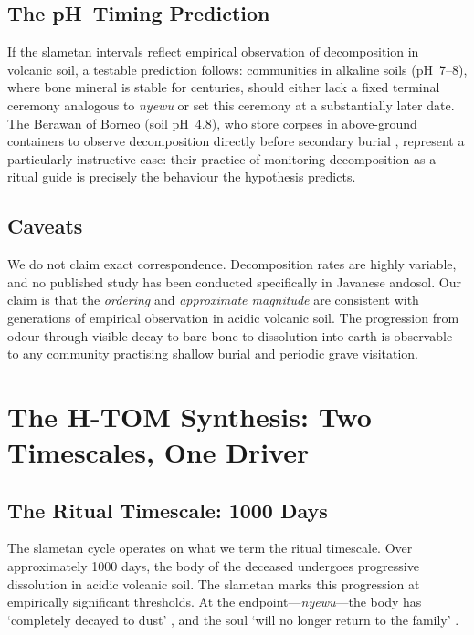 \documentclass[12pt,a4paper]{article}
\begin{document}
\subsection{The pH--Timing Prediction}

If the slametan intervals reflect empirical observation of decomposition in volcanic soil, a testable prediction follows: communities in alkaline soils (pH~7--8), where bone mineral is stable for centuries, should either lack a fixed terminal ceremony analogous to \textit{nyewu} or set this ceremony at a substantially later date. The Berawan of Borneo (soil pH~4.8), who store corpses in above-ground containers to observe decomposition directly before secondary burial \citep{metcalf_1982}, represent a particularly instructive case: their practice of monitoring decomposition as a ritual guide is precisely the behaviour the hypothesis predicts.

\subsection{Caveats}

We do not claim exact correspondence. Decomposition rates are highly variable, and no published study has been conducted specifically in Javanese andosol. Our claim is that the \textit{ordering} and \textit{approximate magnitude} are consistent with generations of empirical observation in acidic volcanic soil. The progression from odour through visible decay to bare bone to dissolution into earth is observable to any community practising shallow burial and periodic grave visitation.


\section{The H-TOM Synthesis: Two Timescales, One Driver}

\subsection{The Ritual Timescale: 1000 Days}

The slametan cycle operates on what we term the ritual timescale. Over approximately 1000 days, the body of the deceased undergoes progressive dissolution in acidic volcanic soil. The slametan marks this progression at empirically significant thresholds. At the endpoint---\textit{nyewu}---the body has `completely decayed to dust' \citep[ch.~6]{geertz_1960}, and the soul `will no longer return to the family' \citep[440]{hendrajaya_2020}.
\end{document}
